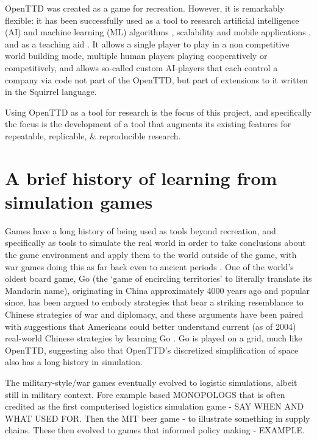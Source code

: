\documentclass[logo,msc,dsti]{infthesis}    %
\begin{document}
OpenTTD was created as a game for recreation. However, it is remarkably flexible: it has been successfully used as a tool to research artificial intelligence (AI) and machine learning (ML) algorithms \cite{wisniewski2011artificial, rios2009trains, bijlsma2014evolving}, scalability and mobile applications \cite{jiang2018mirroring}, and as a teaching aid \cite{HansenMuprhie2018}. It allows a single player to play in a non competitive world building mode, multiple human players playing cooperatively or competitively, and allows so-called custom AI-players that each control a company via code not part of the OpenTTD, but part of extensions to it written in the Squirrel language.

Using OpenTTD as a tool for research is the focus of this project, and specifically the focus is the development of a tool that augments its existing features for repeatable, replicable, \& reproducible research.

\section{A brief history of learning from simulation games}

Games have a long history of being used as tools beyond recreation, and specifically as tools to simulate the real world in order to take conclusions about the game environment and apply them to the world outside of the game, with war games doing this as far back even to ancient periods \cite{mayer2009gaming}. One of the world's oldest board game, Go (the `game of encircling territories' to literally translate its Mandarin name), originating in China approximately 4000 years ago and popular since, has been argued to embody strategies that bear a striking resemblance to Chinese strategies of war and diplomacy, and these arguments have been paired with suggestions that Americans could better understand current (as of 2004) real-world Chinese strategies by learning Go \cite{lai2004learning}. Go is played on a grid, much like OpenTTD, suggesting also that OpenTTD's discretized simplification of space also has a long history in simulation.

The military-style/war games eventually evolved to logistic simulations, albeit still in military context. Fore example based MONOPOLOGS \cite{jackson1959learning} that is often credited as the first computerised logistics simulation game - SAY WHEN AND WHAT USED FOR. Then the MIT beer game - to illustrate something in supply chains. These then evolved to games that informed policy making - EXAMPLE.
\end{document}
